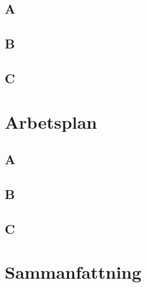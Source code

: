 \documentclass[a4paper, 11pt]{article}
\begin{document}
\subsection{A}


\subsection{B}


\subsection{C}


\section{Arbetsplan}
\label{sec:arbplan}

\subsection{A}


\subsection{B}


\subsection{C}


\section{Sammanfattning}
\end{document}

